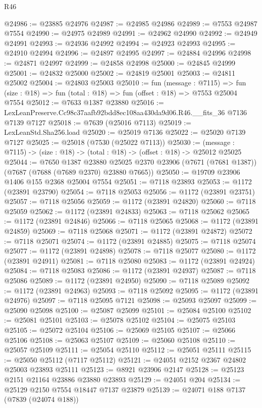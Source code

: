 \begin{lexlean}{R46}
\begin{coremodule}
@24986 := @23885 @24976
@24987 := @24985 @24986
@24989 := @7553 @24987 @7554
@24990 := @24975 @24989
@24991 := @24962 @24990
@24992 := @24949 @24991
@24993 := @24936 @24992
@24994 := @24923 @24993
@24995 := @24910 @24994
@24996 := @24897 @24995
@24997 := @24884 @24996
@24998 := @24871 @24997
@24999 := @24858 @24998
@25000 := @24845 @24999
@25001 := @24832 @25000
@25002 := @24819 @25001
@25003 := @24811 @25002
@25004 := @24803 @25003
@25010 := fun (message : @7115) =>
  fun (size : @18) => fun (total : @18) => fun (offset : @18) => @7553 @25004 @7554
@25012 := @7633 @1387 @23880
@25016 := LexLeanPreserve.Cc98c37aafb92bdd8ec108aa430da9d06.R46.__fits_36 @7136 @7139 @7127
@25018 := @7639 (@25016 @7113)
@25019 := LexLeanStd.Sha256.load
@25020 := @25019 @7136
@25022 := @25020 @7139 @7127
@25025 := @25018 (@7530 (@25022 @7113))
@25030 := (message : @7115) -> (size : @18) -> (total : @18) -> (offset : @18) -> @25012 @25025
@25044 := @7650
    @1387
    @23880
    @25025
    @2370
    @23906
    (@7671 (@7681 @1387))
    (@7687 (@7688 (@7689 @2370) @23880 @7665))
@25050 := @19709 @23906 @1406 @155 @2368 @25004 @7554
@25051 := @7118 @23893
@25053 := @1172 (@23891 @23790)
@25054 := @7118 @25053
@25056 := @1172 (@23891 @23751)
@25057 := @7118 @25056
@25059 := @1172 (@23891 @24820)
@25060 := @7118 @25059
@25062 := @1172 (@23891 @24833)
@25063 := @7118 @25062
@25065 := @1172 (@23891 @24846)
@25066 := @7118 @25065
@25068 := @1172 (@23891 @24859)
@25069 := @7118 @25068
@25071 := @1172 (@23891 @24872)
@25072 := @7118 @25071
@25074 := @1172 (@23891 @24885)
@25075 := @7118 @25074
@25077 := @1172 (@23891 @24898)
@25078 := @7118 @25077
@25080 := @1172 (@23891 @24911)
@25081 := @7118 @25080
@25083 := @1172 (@23891 @24924)
@25084 := @7118 @25083
@25086 := @1172 (@23891 @24937)
@25087 := @7118 @25086
@25089 := @1172 (@23891 @24950)
@25090 := @7118 @25089
@25092 := @1172 (@23891 @24963)
@25093 := @7118 @25092
@25095 := @1172 (@23891 @24976)
@25097 := @7118 @25095 @7121
@25098 := @25093 @25097
@25099 := @25090 @25098
@25100 := @25087 @25099
@25101 := @25084 @25100
@25102 := @25081 @25101
@25103 := @25078 @25102
@25104 := @25075 @25103
@25105 := @25072 @25104
@25106 := @25069 @25105
@25107 := @25066 @25106
@25108 := @25063 @25107
@25109 := @25060 @25108
@25110 := @25057 @25109
@25111 := @25054 @25110
@25112 := @25051 @25111
@25115 := @25050 @25112 (@7117 @25112)
@25121 := @24051 @2152 @2367 @24802 @25003 @23893 @25111
@25123 := @8921 @23906 @2147
@25128 := @25123 @2151 @21164 @23886 @23880 @23893
@25129 := @24051 @204
@25134 := @25129 @2150 @7554 @18447 @7137 @23879
@25139 := @24071 @188 @7137 (@7839 (@24074 @188))

\end{coremodule}
\end{lexlean}

